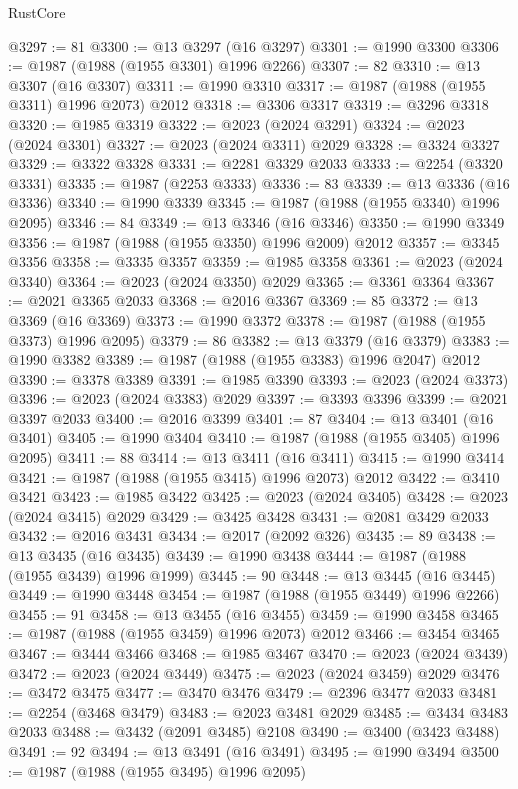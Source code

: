 \begin{lexlean}{RustCore}
\begin{coremodule}
@3297 := 81
@3300 := @13 @3297 (@16 @3297)
@3301 := @1990 @3300
@3306 := @1987 (@1988 (@1955 @3301) @1996 @2266)
@3307 := 82
@3310 := @13 @3307 (@16 @3307)
@3311 := @1990 @3310
@3317 := @1987 (@1988 (@1955 @3311) @1996 @2073) @2012
@3318 := @3306 @3317
@3319 := @3296 @3318
@3320 := @1985 @3319
@3322 := @2023 (@2024 @3291)
@3324 := @2023 (@2024 @3301)
@3327 := @2023 (@2024 @3311) @2029
@3328 := @3324 @3327
@3329 := @3322 @3328
@3331 := @2281 @3329 @2033
@3333 := @2254 (@3320 @3331)
@3335 := @1987 (@2253 @3333)
@3336 := 83
@3339 := @13 @3336 (@16 @3336)
@3340 := @1990 @3339
@3345 := @1987 (@1988 (@1955 @3340) @1996 @2095)
@3346 := 84
@3349 := @13 @3346 (@16 @3346)
@3350 := @1990 @3349
@3356 := @1987 (@1988 (@1955 @3350) @1996 @2009) @2012
@3357 := @3345 @3356
@3358 := @3335 @3357
@3359 := @1985 @3358
@3361 := @2023 (@2024 @3340)
@3364 := @2023 (@2024 @3350) @2029
@3365 := @3361 @3364
@3367 := @2021 @3365 @2033
@3368 := @2016 @3367
@3369 := 85
@3372 := @13 @3369 (@16 @3369)
@3373 := @1990 @3372
@3378 := @1987 (@1988 (@1955 @3373) @1996 @2095)
@3379 := 86
@3382 := @13 @3379 (@16 @3379)
@3383 := @1990 @3382
@3389 := @1987 (@1988 (@1955 @3383) @1996 @2047) @2012
@3390 := @3378 @3389
@3391 := @1985 @3390
@3393 := @2023 (@2024 @3373)
@3396 := @2023 (@2024 @3383) @2029
@3397 := @3393 @3396
@3399 := @2021 @3397 @2033
@3400 := @2016 @3399
@3401 := 87
@3404 := @13 @3401 (@16 @3401)
@3405 := @1990 @3404
@3410 := @1987 (@1988 (@1955 @3405) @1996 @2095)
@3411 := 88
@3414 := @13 @3411 (@16 @3411)
@3415 := @1990 @3414
@3421 := @1987 (@1988 (@1955 @3415) @1996 @2073) @2012
@3422 := @3410 @3421
@3423 := @1985 @3422
@3425 := @2023 (@2024 @3405)
@3428 := @2023 (@2024 @3415) @2029
@3429 := @3425 @3428
@3431 := @2081 @3429 @2033
@3432 := @2016 @3431
@3434 := @2017 (@2092 @326)
@3435 := 89
@3438 := @13 @3435 (@16 @3435)
@3439 := @1990 @3438
@3444 := @1987 (@1988 (@1955 @3439) @1996 @1999)
@3445 := 90
@3448 := @13 @3445 (@16 @3445)
@3449 := @1990 @3448
@3454 := @1987 (@1988 (@1955 @3449) @1996 @2266)
@3455 := 91
@3458 := @13 @3455 (@16 @3455)
@3459 := @1990 @3458
@3465 := @1987 (@1988 (@1955 @3459) @1996 @2073) @2012
@3466 := @3454 @3465
@3467 := @3444 @3466
@3468 := @1985 @3467
@3470 := @2023 (@2024 @3439)
@3472 := @2023 (@2024 @3449)
@3475 := @2023 (@2024 @3459) @2029
@3476 := @3472 @3475
@3477 := @3470 @3476
@3479 := @2396 @3477 @2033
@3481 := @2254 (@3468 @3479)
@3483 := @2023 @3481 @2029
@3485 := @3434 @3483 @2033
@3488 := @3432 (@2091 @3485) @2108
@3490 := @3400 (@3423 @3488)
@3491 := 92
@3494 := @13 @3491 (@16 @3491)
@3495 := @1990 @3494
@3500 := @1987 (@1988 (@1955 @3495) @1996 @2095)

\end{coremodule}
\end{lexlean}
